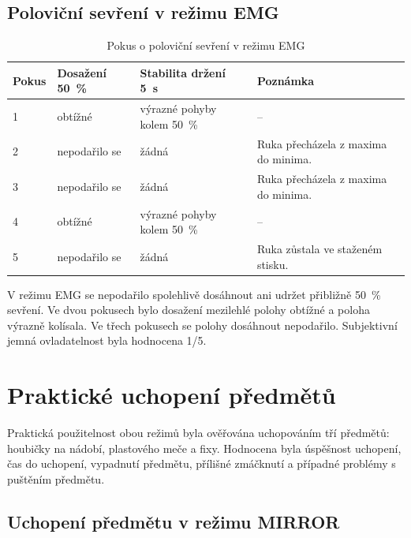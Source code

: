 \subsection{Poloviční sevření v režimu EMG}
\label{subsec:polovicni-emg}

\begin{table}[htbp]
\centering
\caption{Pokus o poloviční sevření v režimu EMG}
\label{tab:emg-polovicni-sevreni}
\setlength{\tabcolsep}{2pt}
\begin{tabular}{|p{}|p{}|p{}|p{}|}
\hline
\textbf{Pokus} & \textbf{Dosažení 50~\%} & \textbf{Stabilita držení 5~s} & \textbf{Poznámka} \\
\hline
1 & obtížné & výrazné pohyby kolem 50~\% & -- \\
\hline
2 & nepodařilo se & žádná & Ruka přecházela z maxima do minima. \\
\hline
3 & nepodařilo se & žádná & Ruka přecházela z maxima do minima. \\
\hline
4 & obtížné & výrazné pohyby kolem 50~\% & -- \\
\hline
5 & nepodařilo se & žádná & Ruka zůstala ve staženém stisku. \\
\hline
\end{tabular}
\end{table}

V režimu EMG se nepodařilo spolehlivě dosáhnout ani udržet přibližně 50~\% sevření. Ve dvou pokusech bylo dosažení mezilehlé polohy obtížné a poloha výrazně kolísala. Ve třech pokusech se polohy dosáhnout nepodařilo. Subjektivní jemná ovladatelnost byla hodnocena 1/5.

\section{Praktické uchopení předmětů}
\label{sec:uchopeni-predmetu}

Praktická použitelnost obou režimů byla ověřována uchopováním tří předmětů: houbičky na nádobí, plastového meče a fixy. Hodnocena byla úspěšnost uchopení, čas do uchopení, vypadnutí předmětu, přílišné zmáčknutí a případné problémy s puštěním předmětu.

\subsection{Uchopení předmětu v režimu MIRROR}
\label{subsec:uchopeni-mirror}

